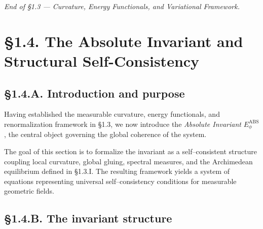 \begin{center}
\textit{End of §1.3 — Curvature, Energy Functionals, and Variational Framework.}
\end{center}


\section{§1.4. The Absolute Invariant and Structural Self-Consistency}
\label{sec:1.4-absinv}

\subsection*{§1.4.A. Introduction and purpose}

Having established the measurable curvature, energy functionals, and renormalization framework in §1.3, we now introduce the \emph{Absolute Invariant} $E_\phi^{\mathrm{ABS}}$, the central object governing the global coherence of the system.

The goal of this section is to formalize the invariant as a self–consistent structure coupling local curvature, global gluing, spectral measures, and the Archimedean equilibrium defined in §1.3.I.  The resulting framework yields a system of equations representing universal self–consistency conditions for measurable geometric fields.

\subsection*{§1.4.B. The invariant structure}

